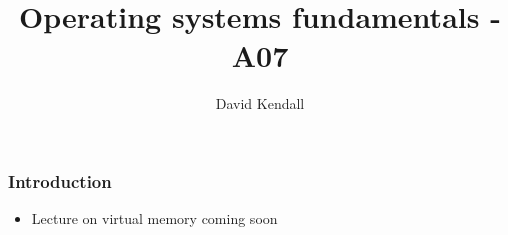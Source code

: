 \documentclass[hyperref={pdfpagelabels=false},svgnames]{beamer}
\title{Operating systems fundamentals - A07}
\subtitle{}
\author{David Kendall}
\institute{Northumbria University}
\date{}
\begin{document}
\begin{frame}
\titlepage
\end{frame}

\begin{frame}
\frametitle{Introduction}
\begin{itemize}
  \item Lecture on virtual memory coming soon
\end{itemize}
\end{frame}
\end{document}
